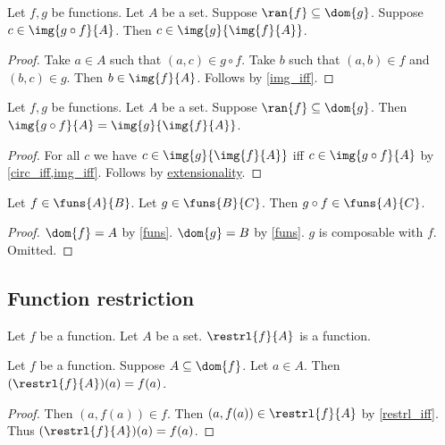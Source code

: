 \begin{proposition}\label{img_of_circ_elim}
    Let $f, g$ be functions.
    Let $A$ be a set.
    Suppose $\ran{f}\subseteq \dom{g}$.
    Suppose $c\in\img{g\circ f}{A}$.
    Then $c\in\img{g}{\img{f}{A}}$.
\end{proposition}
\begin{proof}
    Take $a\in A$ such that $(a,c)\in g\circ f$.
    Take $b$ such that $(a,b)\in f$ and $(b, c)\in g$.
    Then $b\in\img{f}{A}$.
    Follows by \cref{img_iff}.
\end{proof}

\begin{proposition}\label{img_of_circ}
    Let $f, g$ be functions.
    Let $A$ be a set.
    Suppose $\ran{f}\subseteq\dom{g}$.
    Then $\img{g\circ f}{A} = \img{g}{\img{f}{A}}$.
\end{proposition}
\begin{proof}
    For all $c$ we have $c\in\img{g}{\img{f}{A}}$
        iff $c\in\img{g\circ f}{A}$
        by \cref{circ_iff,img_iff}.
    Follows by \hyperref[setext]{extensionality}.
\end{proof}

\begin{proposition}\label{funs_circ}
    Let $f\in\funs{A}{B}$.
    Let $g\in\funs{B}{C}$.
    Then $g\circ f\in\funs{A}{C}$.
\end{proposition}
\begin{proof}
    $\dom{f} = A$ by \cref{funs}.
    $\dom{g} = B$ by \cref{funs}.
    $g$ is composable with $f$.
    Omitted. %
\end{proof}

\subsection{Function restriction}

\begin{proposition}\label{restrl_of_function_is_function}
    Let $f$ be a function.
    Let $A$ be a set.
    $\restrl{f}{A}$ is a function.
\end{proposition}

\begin{proposition}\label{restrl_of_function_apply}
    Let $f$ be a function.
    Suppose $A\subseteq\dom{f}$.
    Let $a\in A$.
    Then $(\restrl{f}{A})(a) = f(a)$.
\end{proposition}
\begin{proof}
    Then $(a,f(a))\in f$.
    Then $(a,f(a))\in \restrl{f}{A}$ by \cref{restrl_iff}.
    Thus $(\restrl{f}{A})(a) = f(a)$.
\end{proof}

